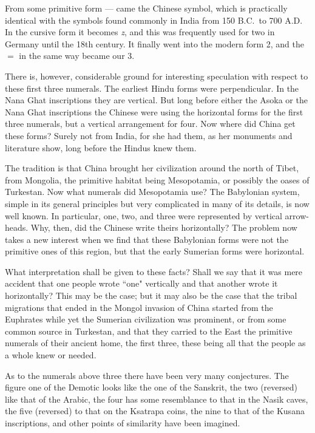\documentclass[11pt,a4paper]{article}
\begin{document}
From some primitive form --- came the Chinese symbol, which is practically identical with the symbols found commonly in India from 150 B.C.\ to 700 A.D. In the cursive form it becomes \textit{z}, and this was frequently used for two in Germany until the 18th century. It finally went into the modern form 2, and the $=$ in the same way became our 3.

There is, however, considerable ground for interesting speculation with respect to these first three numerals. The earliest Hindu forms were perpendicular. In the Nana Ghat inscriptions they are vertical. But long before either the Asoka or the Nana Ghat inscriptions the Chinese were using the horizontal forms for the first three numerals, but a vertical arrangement for four. Now where did China get these forms? Surely not from India, for she had them, as her monuments and literature show, long before the Hindus knew them.

The tradition is that China brought her civilization around the north of Tibet, from Mongolia, the primitive habitat being Mesopotamia, or possibly the oases of Turkestan. Now what numerals did Mesopotamia use? The Babylonian system, simple in its general principles but very complicated in many of its details, is now well known. In particular, one, two, and three were represented by vertical arrow-heads. Why, then, did the Chinese write theirs horizontally? The problem now takes a new interest when we find that these Babylonian forms were not the primitive ones of this region, but that the early Sumerian forms were horizontal.

What interpretation shall be given to these facts? Shall we say that it was mere accident that one people wrote ``one" vertically and that another wrote it horizontally? This may be the case; but it may also be the case that the tribal migrations that ended in the Mongol invasion of China started from the Euphrates while yet the Sumerian civilization was prominent, or from some common source in Turkestan, and that they carried to the East the primitive numerals of their ancient home, the first three, these being all that the people as a whole knew or needed.

As to the numerals above three there have been very many conjectures. The figure one of the Demotic looks like the one of the Sanskrit, the two (reversed) like that of the Arabic, the four has some resemblance to that in the Nasik caves, the five (reversed) to that on the Ksatrapa coins, the nine to that of the Kusana inscriptions, and other points of similarity have been imagined.
\end{document}

